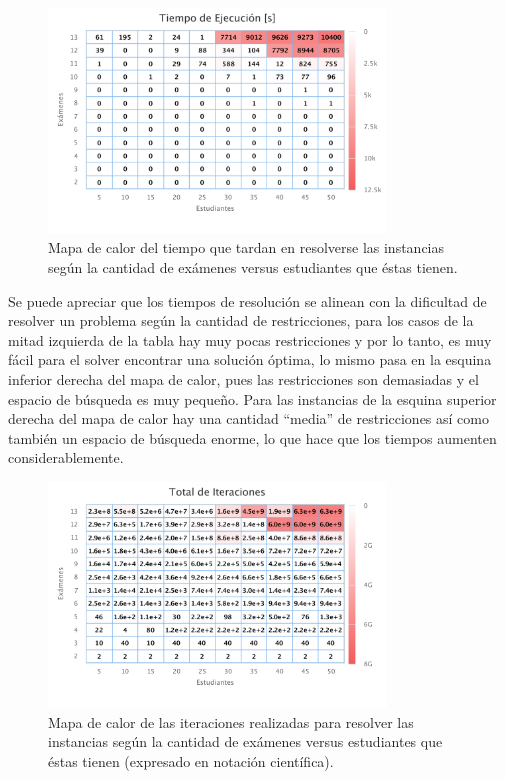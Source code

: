 \documentclass[letter, 10pt]{article}
\begin{document}
\begin{figure}[H]
\begin{center}
\includegraphics[width=0.8\textwidth]{img/g1.pdf}
\end{center}
\caption{Mapa de calor del tiempo que tardan en resolverse las instancias según la cantidad de exámenes versus estudiantes que éstas tienen.}
\label{fig:g1}
\end{figure}

Se puede apreciar que los tiempos de resolución se alinean con la dificultad de resolver un problema según la cantidad de restricciones, para los casos de la mitad izquierda de la tabla hay muy pocas restricciones y por lo tanto, es muy fácil para el solver encontrar una solución óptima, lo mismo pasa en la esquina inferior derecha del mapa de calor, pues las restricciones son demasiadas y el espacio de búsqueda es muy pequeño. Para las instancias de la esquina superior derecha del mapa de calor hay una cantidad ``media'' de restricciones así como también un espacio de búsqueda enorme, lo que hace que los tiempos aumenten considerablemente.

\begin{figure}[H]
\begin{center}
\includegraphics[width=0.8\textwidth]{img/g2.pdf}
\end{center}
\caption{Mapa de calor de las iteraciones realizadas para resolver las instancias según la cantidad de exámenes versus estudiantes que éstas tienen (expresado en notación científica).}
\label{fig:g2}
\end{figure}
\end{document}
